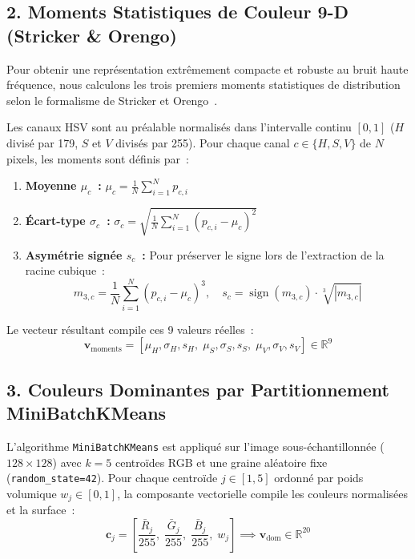 \subsection{2. Moments Statistiques de Couleur 9-D (Stricker \& Orengo)}
Pour obtenir une représentation extrêmement compacte et robuste au bruit haute fréquence, nous calculons les trois premiers moments statistiques de distribution selon le formalisme de Stricker et Orengo~\cite{stricker1995similarity}.

Les canaux HSV sont au préalable normalisés dans l'intervalle continu $[0, 1]$ ($H$ divisé par 179, $S$ et $V$ divisés par 255). Pour chaque canal $c \in \{H, S, V\}$ de $N$ pixels, les moments sont définis par~:
\begin{enumerate}
    \item \textbf{Moyenne $\mu_c$~:} $\mu_c = \frac{1}{N} \sum_{i=1}^{N} p_{c, i}$
    \item \textbf{Écart-type $\sigma_c$~:} $\sigma_c = \sqrt{\frac{1}{N} \sum_{i=1}^{N} (p_{c, i} - \mu_c)^2}$
    \item \textbf{Asymétrie signée $s_c$~:} Pour préserver le signe lors de l'extraction de la racine cubique~:
    \begin{equation}
    m_{3, c} = \frac{1}{N} \sum_{i=1}^{N} (p_{c, i} - \mu_c)^3, \quad s_c = \operatorname{sign}(m_{3, c}) \cdot \sqrt[3]{|m_{3, c}|}
    \end{equation}
\end{enumerate}

Le vecteur résultant compile ces 9 valeurs réelles~:
\begin{equation}
\mathbf{v}_{\text{moments}} = [\mu_H, \sigma_H, s_H, \; \mu_S, \sigma_S, s_S, \; \mu_V, \sigma_V, s_V] \in \mathbb{R}^9
\end{equation}

\subsection{3. Couleurs Dominantes par Partitionnement MiniBatchKMeans}
L'algorithme \texttt{MiniBatchKMeans} est appliqué sur l'image sous-échantillonnée ($128 \times 128$) avec $k=5$ centroïdes RGB et une graine aléatoire fixe (\texttt{random\_state=42}). Pour chaque centroïde $j \in [1, 5]$ ordonné par poids volumique $w_j \in [0, 1]$, la composante vectorielle compile les couleurs normalisées et la surface~:
\begin{equation}
\mathbf{c}_j = \left[ \frac{\bar{R}_j}{255}, \; \frac{\bar{G}_j}{255}, \; \frac{\bar{B}_j}{255}, \; w_j \right] \implies \mathbf{v}_{\text{dom}} \in \mathbb{R}^{20}
\end{equation}

